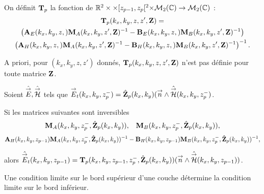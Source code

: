     \begin{defn}%
      \label{def:plan:transfert:impedance}

      On définit \(\mathbf{T}_p\) la fonction de \(\mathbb R^2\times\times [z_{p-1}, z_p[^2\times\mathcal{M}_2(\mathbb C)\rightarrow \mathcal{M}_{2}(\mathbb C)\) :
      \begin{multline*}
        \mathbf{T}_p(k_x,k_y,z,z',\mathbf{Z}) = \\
          \left(\mathbf{A}_{E}(k_x,k_y,z,)\mathbf{M}_{A}(k_x,k_y,z',\mathbf{Z})^{-1} - \mathbf{B}_{E}(k_x,k_y,z,)\mathbf{M}_{B}(k_x,k_y,z',\mathbf{Z})^{-1}\right) 
          \\
          \left(\mathbf{A}_{H}(k_x,k_y,z,)\mathbf{M}_{A}(k_x,k_y,z',\mathbf{Z})^{-1} - \mathbf{B}_{H}(k_x,k_y,z,)\mathbf{M}_{B}(k_x,k_y,z',\mathbf{Z})^{-1}\right)^{-1}.
      \end{multline*}
    \end{defn}

    A priori, pour \((k_x,k_y,z,z')\) donnés, \(\mathbf{T}_p(k_x,k_y,z,z',\mathbf{Z})\) n'est pas définie pour toute matrice \(\mathbf{Z}\).

    \begin{prop}%
      \label{prop:plan:transfert:impedance}

      Soient \(\hat{{\overset{\rightarrow}{E}}},\hat{{\overset{\rightarrow}{\mathcal{H}}}}\) tels que \({\overset{\rightarrow}{E}}_t(k_x,k_y,z_p^-) = \hat{\mathbf{Z}}_{p}(k_x,k_y)({\overset{\rightarrow}{n}} \wedge \hat{{\overset{\rightarrow}{\mathcal{H}}}}(k_x,k_y,z_p^-)\).

      Si les matrices suivantes sont inversibles
      \begin{align*}
        \mathbf{M}_{A}(k_x,k_y,z_p^-, \hat{\mathbf{Z}}_{p}(k_x,k_y)), && \mathbf{M}_{B}(k_x,k_y,z_p^-, \hat{\mathbf{Z}}_{p}(k_x,k_y)),
      \end{align*}
      \begin{align*}
        \mathbf{A}_{H}(k_x,k_y,z_{p-1})\mathbf{M}_{A}(k_x,k_y,z_p^-, \hat{\mathbf{Z}}_{p}(k_x,k_y))^{-1} - \mathbf{B}_{H}(k_x,k_y,z_{p-1})\mathbf{M}_{B}(k_x,k_y,z_p^-, \hat{\mathbf{Z}}_{p}(k_x,k_y))^{-1},
      \end{align*}

      alors \(\hat{{\overset{\rightarrow}{E}}}_t(k_x,k_y,z_{p-1}) = \mathbf{T}_p(k_x,k_y,z_{p-1},z_p^-,\hat{\mathbf{Z}}_{p}(k_x,k_y))({\overset{\rightarrow}{n}} \wedge \hat{{\overset{\rightarrow}{\mathcal{H}}}}(k_x,k_y,z_{p-1}))\).

      Une condition limite sur le bord supérieur d'une couche détermine la condition limite sur le bord inférieur.
    \end{prop}


